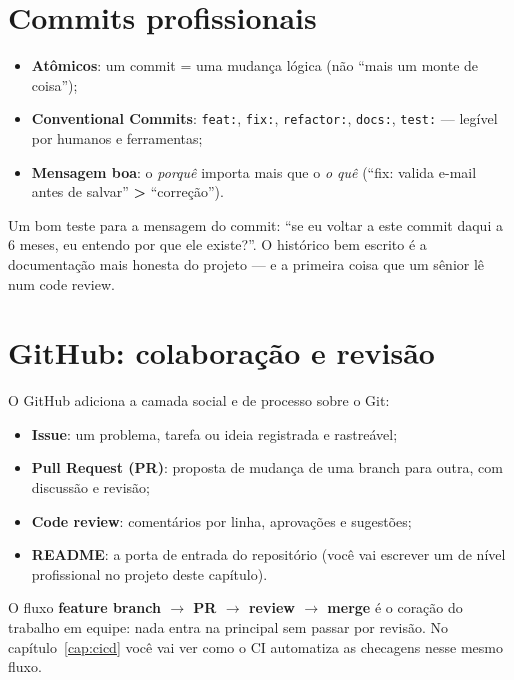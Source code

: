 \section{Commits profissionais}

\begin{itemize}[leftmargin=*, itemsep=0.4em]
  \item \textbf{Atômicos}: um commit = uma mudança lógica (não ``mais um monte de coisa'');
  \item \textbf{Conventional Commits}: \texttt{feat:}, \texttt{fix:}, \texttt{refactor:}, \texttt{docs:}, \texttt{test:} — legível por humanos e ferramentas;
  \item \textbf{Mensagem boa}: o \emph{porquê} importa mais que o \emph{o quê} (``fix: valida e-mail antes de salvar'' \textbf{>} ``correção'').
\end{itemize}

\begin{caixadica}
Um bom teste para a mensagem do commit: ``se eu voltar a este commit daqui a
6 meses, eu entendo por que ele existe?''. O histórico bem escrito é a
documentação mais honesta do projeto — e a primeira coisa que um sênior lê
num code review.
\end{caixadica}

\section{GitHub: colaboração e revisão}

O GitHub adiciona a camada social e de processo sobre o Git:

\begin{itemize}[leftmargin=*, itemsep=0.4em]
  \item \textbf{Issue}: um problema, tarefa ou ideia registrada e rastreável;
  \item \textbf{Pull Request (PR)}: proposta de mudança de uma branch para outra, com discussão e revisão;
  \item \textbf{Code review}: comentários por linha, aprovações e sugestões;
  \item \textbf{README}: a porta de entrada do repositório (você vai escrever um de nível profissional no projeto deste capítulo).
\end{itemize}

\begin{caixaconceito}
O fluxo \textbf{feature branch $\rightarrow$ PR $\rightarrow$ review
$\rightarrow$ merge} é o coração do trabalho em equipe: nada entra na
principal sem passar por revisão. No capítulo~\ref{cap:cicd} você vai ver
como o CI automatiza as checagens nesse mesmo fluxo.
\end{caixaconceito}

